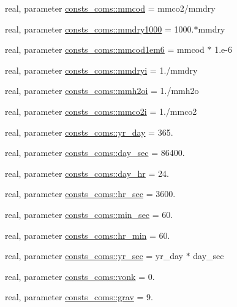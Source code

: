 \begin{DoxyCompactItemize}
real, parameter \hyperlink{namespaceconsts__coms_a35f71d51e4282f3fc1150564317c3a97}{consts\+\_\+coms\+::mmcod} = mmco2/mmdry
\item 
real, parameter \hyperlink{namespaceconsts__coms_a17fe564075e4435419515e05d8a82022}{consts\+\_\+coms\+::mmdry1000} = 1000.$\ast$mmdry
\item 
real, parameter \hyperlink{namespaceconsts__coms_a25939fc53475af3a61a853e5adf1940c}{consts\+\_\+coms\+::mmcod1em6} = mmcod $\ast$ 1.e-\/6
\item 
real, parameter \hyperlink{namespaceconsts__coms_a3a3fc200d63c11c0ae055b6b513fd309}{consts\+\_\+coms\+::mmdryi} = 1./mmdry
\item 
real, parameter \hyperlink{namespaceconsts__coms_ac580048533c43cb8473dcf3b620c9502}{consts\+\_\+coms\+::mmh2oi} = 1./mmh2o
\item 
real, parameter \hyperlink{namespaceconsts__coms_a2df5d20d56bdc29d0d392c9ec513752a}{consts\+\_\+coms\+::mmco2i} = 1./mmco2
\item 
real, parameter \hyperlink{namespaceconsts__coms_adad953349aafb445de8a82640081a357}{consts\+\_\+coms\+::yr\+\_\+day} = 365.
\item 
real, parameter \hyperlink{namespaceconsts__coms_a3ff38434ac06e17e92b1929696b56611}{consts\+\_\+coms\+::day\+\_\+sec} = 86400.
\item 
real, parameter \hyperlink{namespaceconsts__coms_a9cac2538090fb8cf04aaeaf9b1f92466}{consts\+\_\+coms\+::day\+\_\+hr} = 24.
\item 
real, parameter \hyperlink{namespaceconsts__coms_acae5e7f232dc6e70cfdeaf44d9263406}{consts\+\_\+coms\+::hr\+\_\+sec} = 3600.
\item 
real, parameter \hyperlink{namespaceconsts__coms_a34e3f5c2fd6493a836a9797220b50639}{consts\+\_\+coms\+::min\+\_\+sec} = 60.
\item 
real, parameter \hyperlink{namespaceconsts__coms_a1ade40f36e0ba6beb80054d5963b2b23}{consts\+\_\+coms\+::hr\+\_\+min} = 60.
\item 
real, parameter \hyperlink{namespaceconsts__coms_ae3a6000a33c9aa556d49b173b86f3b49}{consts\+\_\+coms\+::yr\+\_\+sec} = yr\+\_\+day $\ast$ day\+\_\+sec
\item 
real, parameter \hyperlink{namespaceconsts__coms_ad66b0d002b8c2531bde3625010d94eac}{consts\+\_\+coms\+::vonk} = 0.
\item 
real, parameter \hyperlink{namespaceconsts__coms_ac1aae6e7087ffc22025cd1527c705e3e}{consts\+\_\+coms\+::grav} = 9.
\item 

\end{DoxyCompactItemize}
